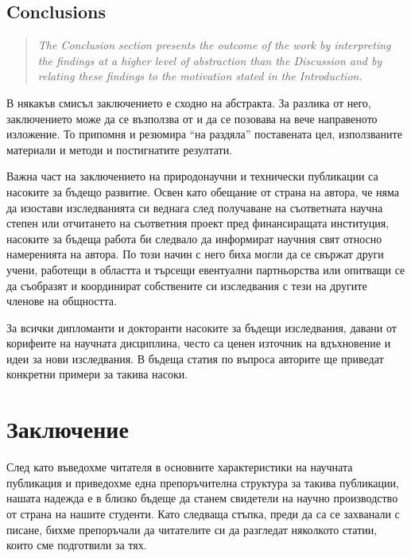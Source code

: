\documentclass[11pt, oneside]{article}     %
\newenvironment{quotenature}{\begin{quote}\itshape}{\cite{nature}\end{quote}}
\begin{document}
\subsection*{Conclusions}

\begin{quotenature}
  The Conclusion section presents the outcome of the work by
  interpreting the findings at a higher level of abstraction than the
  Discussion and by relating these findings to the motivation stated
  in the Introduction.
\end{quotenature}

В някакъв смисъл заключението е сходно на абстракта. За разлика от него, заключението може да се възползва от и да се позовава на вече направеното изложение. То припомня и резюмира ``на раздяла'' поставената цел, използваните материали и методи и постигнатите резултати.

Важна част на заключението на природонаучни и технически публикации са насоките за бъдещо развитие. Освен като обещание от страна на автора, че няма да изостави изследванията си веднага след получаване на съответната научна степен или отчитането на съответния проект пред финансиращата институция, насоките за бъдеща работа би следвало да информират научния свят относно намеренията на автора. По този начин с него биха могли да се свържат други учени, работещи в областта и търсещи евентуални партньорства или опитващи се да съобразят и координират собствените си изследвания с тези на другите членове на общността. 

За всички дипломанти и докторанти насоките за бъдещи изследвания, давани от корифеите на научната дисциплина, често са ценен източник на вдъхновение и идеи за нови изследвания. В бъдеща статия по въпроса авторите ще приведат конкретни примери за такива насоки.

\section{Заключение}

След като въведохме читателя в основните характеристики на научната публикация и приведохме една препоръчителна структура за такива публикации, нашата надежда е в близко бъдеще да станем свидетели на научно производство от страна на нашите студенти. Като следваща стъпка, преди да са се захванали с писане, бихме препоръчали да читателите си да разгледат няколкото статии, които сме подготвили за тях.
\end{document}
